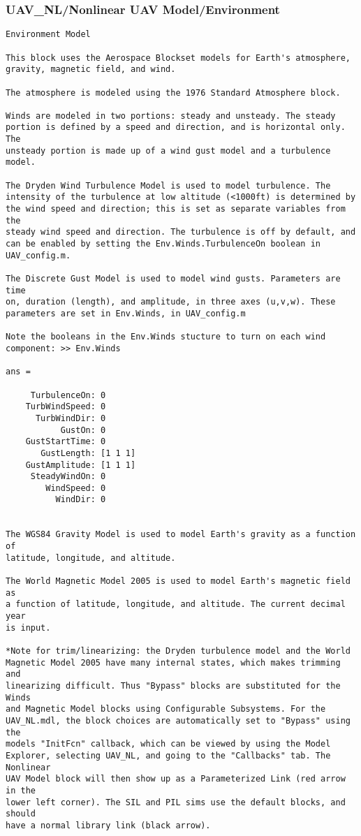 \documentclass[12pt]{article}
\begin{document}
\subsubsection{UAV\_NL/Nonlinear UAV Model/Environment}
\begin{verbatim}
Environment Model

This block uses the Aerospace Blockset models for Earth's atmosphere,
gravity, magnetic field, and wind. 

The atmosphere is modeled using the 1976 Standard Atmosphere block.

Winds are modeled in two portions: steady and unsteady. The steady
portion is defined by a speed and direction, and is horizontal only. The
unsteady portion is made up of a wind gust model and a turbulence model. 

The Dryden Wind Turbulence Model is used to model turbulence. The
intensity of the turbulence at low altitude (<1000ft) is determined by
the wind speed and direction; this is set as separate variables from the
steady wind speed and direction. The turbulence is off by default, and
can be enabled by setting the Env.Winds.TurbulenceOn boolean in
UAV_config.m.

The Discrete Gust Model is used to model wind gusts. Parameters are time
on, duration (length), and amplitude, in three axes (u,v,w). These
parameters are set in Env.Winds, in UAV_config.m

Note the booleans in the Env.Winds stucture to turn on each wind
component: >> Env.Winds

ans = 

     TurbulenceOn: 0
    TurbWindSpeed: 0
      TurbWindDir: 0
           GustOn: 0
    GustStartTime: 0
       GustLength: [1 1 1]
    GustAmplitude: [1 1 1]
     SteadyWindOn: 0
        WindSpeed: 0
          WindDir: 0


The WGS84 Gravity Model is used to model Earth's gravity as a function of
latitude, longitude, and altitude.

The World Magnetic Model 2005 is used to model Earth's magnetic field as
a function of latitude, longitude, and altitude. The current decimal year
is input.

*Note for trim/linearizing: the Dryden turbulence model and the World
Magnetic Model 2005 have many internal states, which makes trimming and
linearizing difficult. Thus "Bypass" blocks are substituted for the Winds
and Magnetic Model blocks using Configurable Subsystems. For the
UAV_NL.mdl, the block choices are automatically set to "Bypass" using the
models "InitFcn" callback, which can be viewed by using the Model
Explorer, selecting UAV_NL, and going to the "Callbacks" tab. The Nonlinear
UAV Model block will then show up as a Parameterized Link (red arrow in the
lower left corner). The SIL and PIL sims use the default blocks, and should
have a normal library link (black arrow).




\end{verbatim}
\end{document}
